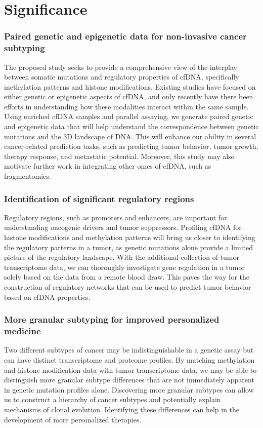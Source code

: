 \documentclass[11pt]{article}
\begin{document}
\newpage
\section*{Significance}
\subsubsection*{Paired genetic and epigenetic data for non-invasive cancer subtyping} The proposed study seeks to provide a comprehensive view of the interplay between somatic mutations and regulatory properties of cfDNA, specifically methylation patterns and histone modifications. 
Existing studies have focused on either genetic or epigenetic aspects of cfDNA, and only recently have there been efforts in understanding how these modalities interact within the same sample. \cite{bie_multimodal_2023, cui_prediction_2024}
Using enriched cfDNA samples and parallel assaying, we generate paired genetic and epigenetic data that will help understand the correspondence between genetic mutations and the 3D landscape of DNA.
This will enhance our ability in several cancer-related prediction tasks, such as predicting tumor behavior, tumor growth, therapy response, and metastatic potential. 
Moreover, this study may also motivate further work in integrating other omes of cfDNA, such as fragmentomics. \cite{penny_chromatin-_2024} 
\subsubsection*{Identification of significant regulatory regions} Regulatory regions, such as promoters and enhancers, are important for understanding oncogenic drivers and tumor suppressors. 
Profiling cfDNA for histone modifications and methylation patterns will bring us closer to identifying the regulatory patterns in a tumor, as genetic mutations alone provide a limited picture of the regulatory landscape. 
With the additional collection of tumor transcriptome data, we can thoroughly investigate gene regulation in a tumor solely based on the data from a remote blood draw.
This paves the way for the construction of regulatory networks that can be used to predict tumor behavior based on cfDNA properties.
\subsubsection*{More granular subtyping for improved personalized medicine}
Two different subtypes of cancer may be indistinguishable in a genetic assay but can have distinct transcriptome and proteome profiles. \cite{penny_chromatin-_2024}
By matching methylation and histone modification data with tumor transcriptome data, we may be able to distinguish more granular subtype differences that are not immediately apparent in genetic mutation profiles alone. \cite{heeke_tumor-_2024}
Discovering more granular subtypes can allow us to construct a hierarchy of cancer subtypes and potentially explain mechanisms of clonal evolution. 
Identifying these differences can help in the development of more personalized therapies.
\end{document}
